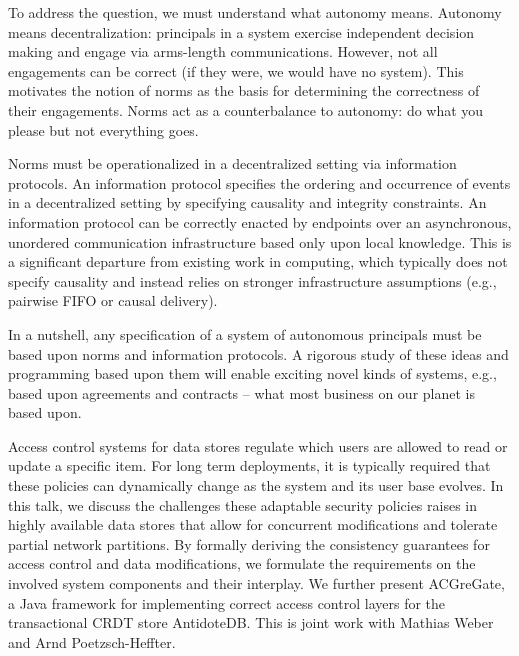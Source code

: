 \documentclass[a4paper,UKenglish]{dagrep-v2018}
\begin{document}
To address the question, we must understand what autonomy means. Autonomy means decentralization: principals in a system exercise independent decision making and engage via arms-length communications.  However, not all engagements can be correct (if they were, we would have no system).  This motivates the notion of norms as the basis for determining the correctness of their engagements.  Norms act as a counterbalance to autonomy: do what you please but not everything goes.  

Norms must be operationalized in a decentralized setting via information protocols.  An information protocol specifies the ordering and occurrence of events in a decentralized setting by specifying causality and integrity constraints.  An information protocol can be correctly enacted by endpoints over an asynchronous, unordered communication infrastructure based only upon local knowledge.  This is a significant departure from existing work in computing, which typically does not specify causality and instead relies on stronger infrastructure assumptions (e.g., pairwise FIFO or causal delivery).

In a nutshell, any specification of a system of autonomous principals must be based upon norms and information protocols.  A rigorous study of these ideas and programming based upon them will enable exciting novel kinds of systems, e.g., based upon agreements and contracts -- what most business on our planet is based upon.


\license

Access control systems for data stores regulate which users are allowed to read or update a specific item.
For long term deployments, it is typically required that these policies can dynamically change as the system and its user base evolves.
In this talk, we discuss the challenges these adaptable security policies raises in highly available data stores that allow for concurrent modifications and tolerate partial network partitions.
By formally deriving the consistency guarantees for access control and data modifications, we formulate the requirements on the involved system components and their interplay.
We further present ACGreGate, a Java framework for implementing correct access control layers for the transactional CRDT store AntidoteDB.
This is joint work with Mathias Weber and Arnd Poetzsch-Heffter.
\end{document}
